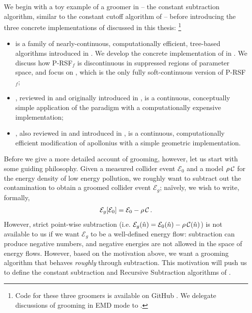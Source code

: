 We begin with a toy example of a \PIRANHA{} groomer in  -- the constant subtraction algorithm, similar to the constant cutoff algorithm of  -- before introducing the three concrete implementations of \PIRANHA{} discussed in this thesis:%
\footnote{
    Code for these three \PIRANHA{} groomers is available on GitHub \cite{piranhagithub}.
    We delegate discussions of \PIRANHA{} grooming in EMD mode to .
}
\begin{itemize}
    \item
         is a family of nearly-continuous, computationally efficient, tree-based algorithms introduced in .
    We develop the concrete implementation of  in .
    We discuss how P-RSF\(_f\) is discontinuous in suppressed regions of parameter space, and focus on , which is the only fully soft-continuous version of P-RSF\(_f\);

    \item
    , reviewed in  and originally introduced in , is a continuous, conceptually simple application of the \PIRANHA{} paradigm with a computationally expensive implementation;

    \item
        , also reviewed in  and introduced in , is a continuous, computationally efficient modification of \gls{apollonius} with a simple geometric implementation.
\end{itemize}



Before we give a more detailed account of \PIRANHA{} grooming, however, let us start with some guiding philosophy.
%
Given a measured collider event \(\mathcal{E}_0\) and a model \(\rho\,\mathcal{C}\) for the energy density of low energy pollution, we roughly want to subtract out the contamination to obtain a groomed collider event \(\mathcal{E}_g\);
%
na\"ively, we wish to write, formally,
\begin{align}
    \label{eq:naive-subtraction}
    \mathcal{E}_g[\mathcal{E}_0]
    =
    \mathcal{E}_0
    -
    \rhoC
    \,.
\end{align}
However, strict point-wise subtraction (i.e. \(\mathcal{E}_g(\hat{n}) = \mathcal{E}_0(\hat{n}) -\rho\,\mathcal{C}(\hat{n})\)) is not available to us if we want \(\mathcal{E}_g\) to be a well-defined energy flow:
%
subtraction can produce negative numbers, and negative energies are not allowed in the space of energy flows.
%
However, based on the motivation above, we want a grooming algorithm that behaves \emph{roughly} through subtraction.
%
This motivation will push us to define the constant subtraction and Recursive Subtraction algorithms of .

